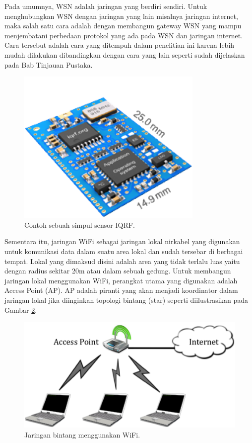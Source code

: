 \documentclass{jtetiproposalskripsi}
\begin{document}
Pada umumnya, WSN adalah jaringan yang berdiri sendiri. Untuk menghubungkan WSN dengan jaringan yang lain misalnya jaringan internet, maka salah satu cara adalah dengan membangun gateway WSN yang mampu menjembatani perbedaan protokol yang ada pada WSN dan jaringan internet. Cara tersebut adalah cara yang ditempuh dalam penelitian ini karena lebih mudah dilakukan dibandingkan dengan cara yang lain seperti sudah dijelaskan pada Bab Tinjauan Pustaka.

\begin{figure}[ht!]
  \centering
    \includegraphics{gambar/iqrf}
    \caption{Contoh sebuah simpul sensor IQRF.}
    \label{iqrf}
\end{figure}

Sementara itu, jaringan WiFi sebagai jaringan lokal nirkabel yang digunakan untuk komunikasi data dalam suatu area lokal dan sudah tersebar di berbagai tempat. Lokal yang dimaksud disini adalah area yang tidak terlalu luas yaitu dengan radius sekitar 20m atau dalam sebuah gedung. Untuk membangun jaringan lokal menggunakan WiFi, perangkat utama yang digunakan adalah Access Point (AP). AP adalah piranti yang akan menjadi koordinator dalam jaringan lokal jika diinginkan topologi bintang (star) seperti diilustrasikan pada Gambar \ref{star}.

\begin{figure}[ht!]
  \centering
    \includegraphics{gambar/star}
    \caption{Jaringan bintang menggunakan WiFi.}
    \label{star}
\end{figure}
\end{document}
